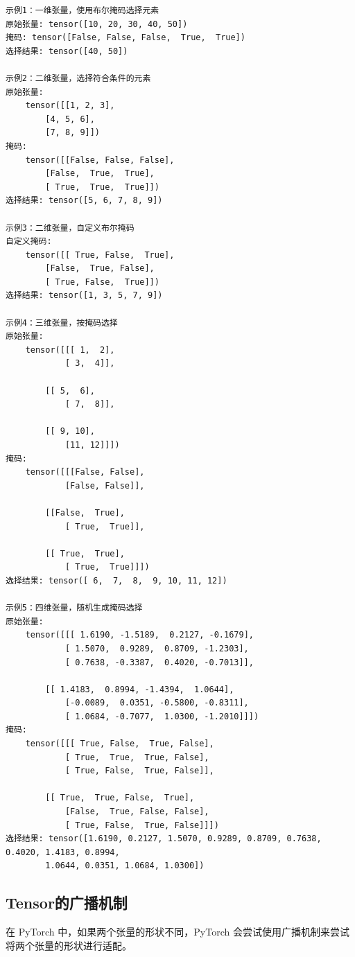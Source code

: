 \begin{lstlisting}[style=demostyle,numbers=none]
示例1：一维张量，使用布尔掩码选择元素
原始张量: tensor([10, 20, 30, 40, 50])
掩码: tensor([False, False, False,  True,  True])
选择结果: tensor([40, 50])

示例2：二维张量，选择符合条件的元素
原始张量:
    tensor([[1, 2, 3],
        [4, 5, 6],
        [7, 8, 9]])
掩码:
    tensor([[False, False, False],
        [False,  True,  True],
        [ True,  True,  True]])
选择结果: tensor([5, 6, 7, 8, 9])

示例3：二维张量，自定义布尔掩码
自定义掩码:
    tensor([[ True, False,  True],
        [False,  True, False],
        [ True, False,  True]])
选择结果: tensor([1, 3, 5, 7, 9])

示例4：三维张量，按掩码选择
原始张量:
    tensor([[[ 1,  2],
            [ 3,  4]],

        [[ 5,  6],
            [ 7,  8]],

        [[ 9, 10],
            [11, 12]]])
掩码:
    tensor([[[False, False],
            [False, False]],

        [[False,  True],
            [ True,  True]],

        [[ True,  True],
            [ True,  True]]])
选择结果: tensor([ 6,  7,  8,  9, 10, 11, 12])

示例5：四维张量，随机生成掩码选择
原始张量:
    tensor([[[ 1.6190, -1.5189,  0.2127, -0.1679],
            [ 1.5070,  0.9289,  0.8709, -1.2303],
            [ 0.7638, -0.3387,  0.4020, -0.7013]],

        [[ 1.4183,  0.8994, -1.4394,  1.0644],
            [-0.0089,  0.0351, -0.5800, -0.8311],
            [ 1.0684, -0.7077,  1.0300, -1.2010]]])
掩码:
    tensor([[[ True, False,  True, False],
            [ True,  True,  True, False],
            [ True, False,  True, False]],

        [[ True,  True, False,  True],
            [False,  True, False, False],
            [ True, False,  True, False]]])
选择结果: tensor([1.6190, 0.2127, 1.5070, 0.9289, 0.8709, 0.7638, 0.4020, 1.4183, 0.8994,
        1.0644, 0.0351, 1.0684, 1.0300])
\end{lstlisting}

\subsection{Tensor的广播机制}
\label{subsec:Pytorch的Tensor的广播机制}
在 PyTorch 中，如果两个张量的形状不同，PyTorch 会尝试使用广播机制来尝试将两个张量的形状进行适配。

